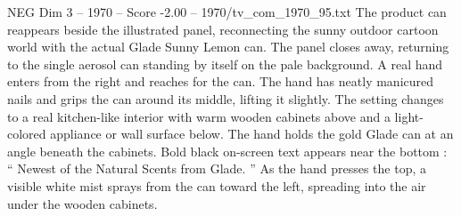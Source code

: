 \begin{textsample}{NEG Dim 3 – 1970 – Score -2.00 – 1970/tv\_com\_1970\_95.txt}
The product can reappears beside the illustrated panel, reconnecting the sunny outdoor cartoon world with the actual Glade Sunny Lemon can.
The panel closes away, returning to the single aerosol can standing by itself on the pale background.
A real hand enters from the right and reaches for the can.
The hand has neatly manicured nails and grips the can around its middle, lifting it slightly.
The setting changes to a real kitchen-like interior with warm wooden cabinets above and a light-colored appliance or wall surface below.
The hand holds the gold Glade can at an angle beneath the cabinets.
Bold black on-screen text appears near the bottom : “ Newest of the Natural Scents from Glade. ” As the hand presses the top, a visible white mist sprays from the can toward the left, spreading into the air under the wooden cabinets.

\end{textsample}
